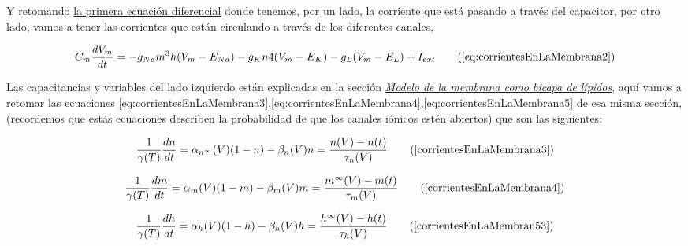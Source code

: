 Y retomando \hyperlink{LaEq}{la primera ecuación diferencial} donde tenemos, por un lado, la corriente que está pasando a través del capacitor, por otro lado, vamos a tener las corrientes que están circulando a través de los diferentes canales, 

\begin{equation}
  C_{m} \dfrac{dV_{m}}{dt} = - g_{Na} m^3 h(V_{m} - E_{Na}) - g_{K} n 4 (V_{m} - E_{K}) - g_{L} (V_{m} - E_{L}) + I_{ext}
  \tag{\ref{eq:corrientesEnLaMembrana2}}
\end{equation}

Las capacitancias y variables del lado izquierdo están explicadas en la sección \hyperlink{secc}{\emph{Modelo de la membrana como bicapa de lípidos}}, aquí vamos a retomar las ecuaciones \ref{eq:corrientesEnLaMembrana3},\ref{eq:corrientesEnLaMembrana4},\ref{eq:corrientesEnLaMembrana5} de esa misma sección, (recordemos que estás ecuaciones describen la probabilidad de que los canales iónicos estén abiertos) que son las siguientes:

\begin{equation}
  \dfrac{1}{\gamma(T)}\dfrac{dn}{dt} =  \alpha_{n^\infty} (V)(1 - n) - \beta_{n} (V) n = \dfrac{n(V)-n(t)}{\tau_{n}(V)}
  \tag{\ref{corrientesEnLaMembrana3}}
\end{equation}

\begin{equation}
  \dfrac{1}{\gamma(T)}\dfrac{dm}{dt} =  \alpha_{m} (V)(1 - m) - \beta_{m} (V) m = \dfrac{m^\infty(V)-m(t)}{\tau_{m}(V)}
  \tag{\ref{corrientesEnLaMembrana4}}
\end{equation}

\begin{equation}
  \dfrac{1}{\gamma(T)}\dfrac{dh}{dt} =  \alpha_{h} (V)(1 - h) - \beta_{h} (V) h = \dfrac{h^\infty(V)-h(t)}{\tau_{h}(V)}
  \tag{\ref{corrientesEnLaMembran53}}
\end{equation}

